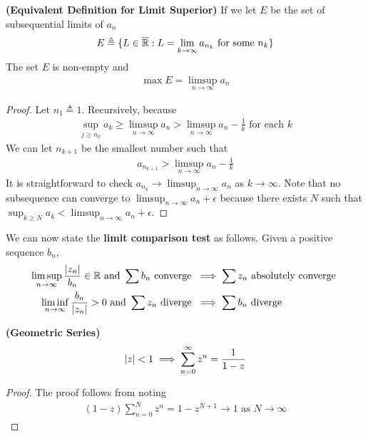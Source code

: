 \documentclass{report}
\begin{document}
\begin{theorem}
\textbf{(Equivalent Definition for Limit Superior)}
If we let $E$ be the set of subsequential limits of $a_n$
 \begin{align*}
E\triangleq \{ L\in\overline{\mathbb{R}}:L=\lim_{k\to \infty}a_{n_k}\text{ for some }n_k \}
\end{align*}
The set $E$ is non-empty and 
\begin{align*}
\max E=\limsup_{n\to\infty} a_n
\end{align*}
\end{theorem}
\begin{proof}
Let $n_1\triangleq 1$. Recursively, because
\begin{align*}
\sup_{j\geq n_k}a_k\geq \limsup_{n\to\infty} a_n>\limsup_{n\to\infty} a_n - \frac{1}{k}\text{ for each }k
\end{align*}
We can let $n_{k+1}$ be the smallest number such that 
\begin{align*}
a_{n_{k+1}}>\limsup_{n\to\infty} a_n - \frac{1}{k}
\end{align*}
It is straightforward to check $a_{n_k}\to \limsup_{n\to\infty} a_n$ as $k\to \infty$. Note that no subsequence can converge to $\limsup_{n\to\infty} a_n+\epsilon $ because there exists $N$ such that  $\sup_{k\geq N}a_k<\limsup_{n\to\infty} a_n+\epsilon $. 
\end{proof}
\begin{mdframed}
  We can now state the \textbf{limit comparison test} as follows. Given a positive sequence $b_n$, 
\begin{align*}
  \limsup_{n\to\infty} \frac{\left|z_n\right|}{b_n}\in\mathbb{R} \text{ and }\sum b_n\text{ converge }&\implies \sum z_n\text{ absolutely converge } \\
 \liminf_{n\to\infty} \frac{b_n}{\left|z_n\right|}>0\text{ and }\sum z_n \text{ diverge }&\implies \sum b_n\text{ diverge }
\end{align*}
\end{mdframed}
\begin{theorem}
\label{geometric series}
\textbf{(Geometric Series)} 
\begin{align*}
\left|z\right|< 1 \implies \sum_{n=0}^{\infty} z^n= \frac{1}{1-z}
\end{align*}
\end{theorem}
\begin{proof}
The proof follows from noting  
\begin{align*}
  (1-z)\sum_{n=0}^N z^n=1-z^{N+1}\to 1\text{ as }N\to \infty
\end{align*}
\end{proof}
\end{document}
